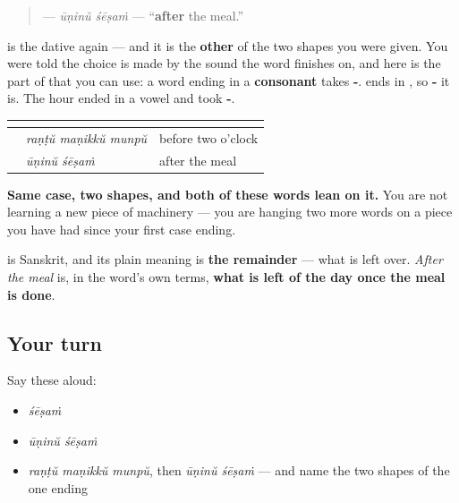 \begin{quote}
\textbf{ } — \emph{ūṇinŭ śēṣaṁ} — \textquotedblleft{}\textbf{after} the meal.\textquotedblright{}
\end{quote}

\begin{grammarlens}[title={Grammar Lens: the same case, wearing its other shape}]
\textbf{} is the dative again — and it is the \textbf{other} of the two shapes you were given. You were told the choice is made by the sound the word finishes on, and here is the part of that you can use: a word ending in a \textbf{consonant} takes \textbf{-}. \textbf{} ends in \textbf{}, so \textbf{-} it is. The hour ended in a vowel and took \textbf{-}.

\noindent
\begin{tabularx}{\linewidth}{@{}>{\raggedright\arraybackslash}X>{\raggedright\arraybackslash}X>{\raggedright\arraybackslash}X@{}}
\toprule
\textbf{} & \textbf{} & \textbf{} \\
\midrule
\textbf{\ml{രണ്ട്} \ml{മണിക്ക്} \ml{മുൻപ്}} & \emph{raṇṭŭ maṇikkŭ munpŭ} & before two o'clock \\
\textbf{\ml{ഊണിന്} \ml{ശേഷം}} & \emph{ūṇinŭ śēṣaṁ} & after the meal \\
\bottomrule
\end{tabularx}

\textbf{Same case, two shapes, and both of these words lean on it.} You are not learning a new piece of machinery — you are hanging two more words on a piece you have had since your first case ending.
\end{grammarlens}

\begin{culture}
\textbf{} is Sanskrit, and its plain meaning is \textbf{the remainder} — what is left over. \emph{After the meal} is, in the word's own terms, \textbf{what is left of the day once the meal is done}.
\end{culture}

\subsection*{Your turn}
Say these aloud:

\begin{itemize}
\raggedright
  \item \emph{śēṣaṁ}
  \item \emph{ūṇinŭ śēṣaṁ}
  \item \emph{raṇṭŭ maṇikkŭ munpŭ}, then \emph{ūṇinŭ śēṣaṁ} — and name the two shapes of the one ending
\end{itemize}


